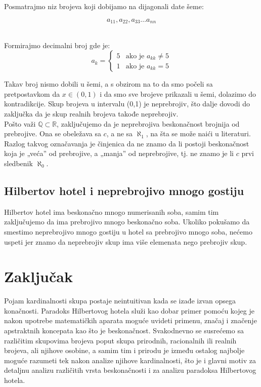 \documentclass[a4paper]{article}
\begin{document}
Posmatrajmo niz brojeva koji dobijamo na dijagonali date šeme:

$$a_{11},a_{22},a_{33} \ldots a_{nn}$$\\

\par 
Formirajmo decimalni broj gde je:
$$
a_{k}= \begin{cases}
5 & \text{ako je } a_{kk}\neq 5 \\
1 & \text{ako je } a_{kk}= 5
\end{cases}
$$

Takav broj nismo dobili u šemi, a s obzirom na to da smo počeli sa pretpostavkom da $x\in(0,1)$ i da smo sve brojeve prikazali u šemi, dolazimo do kontradikcije. Skup brojeva u intervalu (0,1) je neprebrojiv, što dalje dovodi do zaključka da je skup realnih brojeva takođe neprebrojiv.\\

Pošto važi $\mathbb{Q}\subset \mathbb{R}$, zaključujemo da je neprebrojiva beskonačnost brojnija od prebrojive. Ona se obeležava sa $c$, a ne sa $\aleph_{1}$, na šta se može naići u literaturi. Razlog takvog označavanja je činjenica da ne znamo da li postoji beskonačnost koja je „veća” od prebrojive, a „manja” od neprebrojive, tj. ne znamo je li $c$ prvi sledbenik $\aleph_{0}$.\\
\subsection{Hilbertov hotel i neprebrojivo mnogo gostiju}
Hilbertov hotel ima beskonačno mnogo numerisanih soba, samim tim zaključujemo da ima prebrojivo mnogo beskonačno soba. Ukoliko pokušamo da smestimo neprebrojivo mnogo gostiju u hotel sa prebrojivo mnogo soba, nećemo uspeti jer znamo da neprebrojiv skup ima više elemenata nego prebrojiv skup.

\section{Zaključak}
\label{poglavlje:Zaključak}
Pojam kardinalnosti skupa postaje neintuitivan kada se izađe izvan opsega konačnosti. Paradoks Hilbertovog hotela služi kao dobar primer pomoću kojeg je nakon upotrebe matematičkih aparata moguće uvideti primenu, značaj i značenje apstraktnih koncepata kao što je beskonačnost. Svakodnevno se susrećemo sa različitim skupovima brojeva poput skupa prirodnih, racionalnih ili realnih brojeva, ali njihove osobine, a samim tim i prirodu je između ostalog najbolje moguće razumeti tek nakon analize njihove kardinalnosti, što je i glavni motiv za detaljnu analizu različitih vrsta beskonačnosti i za analizu paradoksa Hilbertovog hotela.

\newpage


\renewcommand{\refname}{Literatura}


\end{document}
